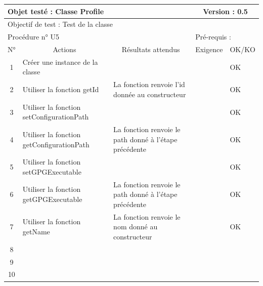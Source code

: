 \documentclass{../res/univ-projet}
\begin{document}
\begin{center}
    
    \begin{tabular}{|c|p{5cm}|p{5cm}|p{1.5cm}|p{1.5cm}|}
      \hline
      \multicolumn{3}{|l|}{Objet testé : Classe Profile} & \multicolumn{2}{c|}{Version : 0.5}\\ \hline
      \multicolumn{5}{|l|}{Objectif de test : Test de la classe}\\ \hline
      \multicolumn{3}{|l|}{Procédure n° U5} & \multicolumn{2}{p{3cm}|}{Pré-requis : }\\ \hline
      \multicolumn{1}{|c|}{N°} & \multicolumn{1}{c|}{Actions} & \multicolumn{1}{c|}{Résultats attendus} & 
      \multicolumn{1}{c|}{Exigence} & \multicolumn{1}{c|}{OK/KO}\\ \hline
      1 & Créer une instance de la classe &  &  & OK \\
      2 & Utiliser la fonction getId & La fonction renvoie l'id donnée au constructeur &  & OK \\
      3 & Utiliser la fonction setConfigurationPath &  &  & OK \\
      4 & Utiliser la fonction getConfigurationPath & La fonction renvoie le path donné à l'étape précédente &  & OK \\
      5 & Utiliser la fonction setGPGExecutable &  &  & OK \\
      6 & Utiliser la fonction getGPGExecutable & La fonction renvoie le path donné à l'étape précédente &  & OK \\
      7 & Utiliser la fonction getName & La fonction renvoie le nom donné au constructeur &  & OK \\
      8 &  &  &  &  \\
      9 &  &  &  & \\
      10 &  &  &  &\\ 
  \hline
    \end{tabular}
    \vskip 2.2cm
    

\end{center}
\end{document}
